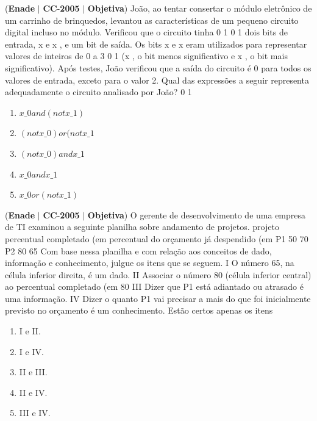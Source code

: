 \documentclass{exam}
\begin{document}
\begin{questions}
\question (\textbf{Enade} $|$ \textbf{CC}-\textbf{2005} $|$ \textbf{Objetiva})
João, ao tentar consertar o módulo eletrônico de um
carrinho de brinquedos, levantou as características de um pequeno
circuito digital incluso no módulo. Verificou que o circuito tinha
0 1 0 1
dois bits de entrada, x e x , e um bit de saída. Os bits x e x
eram utilizados para representar valores de inteiros de 0 a 3
0 1
(x , o bit menos significativo e x , o bit mais significativo).
Após testes, João verificou que a saída do circuito é 0 para
todos os valores de entrada, exceto para o valor 2.
Qual das expressões a seguir representa adequadamente o circuito
analisado por João?
0 1
	\begin{enumerate}[label=\alph*)]
		\item  $ x\_0 and (not x\_1 ) $
		\item  $ (not x\_0 ) or (not x\_1 $
		\item  $(not x\_0 ) and x\_1$
		\item  $x\_0 and x\_1$
		\item  $x\_0 or (not x\_1)$
	\end{enumerate}

\question (\textbf{Enade} $|$ \textbf{CC}-\textbf{2005} $|$ \textbf{Objetiva})
O gerente de desenvolvimento de uma empresa de
TI examinou a seguinte planilha sobre andamento de
projetos.
projeto
percentual
completado (em %
percentual do orçamento
já despendido (em %
P1 50 70
P2 80 65
Com base nessa planilha e com relação aos conceitos de dado,
informação e conhecimento, julgue os itens que se seguem.
I O número 65, na célula inferior direita, é um dado.
II Associar o número 80 (célula inferior central) ao percentual
completado (em %
80%
III Dizer que P1 está adiantado ou atrasado é uma informação.
IV Dizer o quanto P1 vai precisar a mais do que foi
inicialmente previsto no orçamento é um conhecimento.
Estão certos apenas os itens
	\begin{enumerate}[label=\alph*)]
		\item  I e II.
		\item  I e IV.
		\item  II e III.
		\item  II e IV.
		\item  III e IV.
	\end{enumerate}


\end{questions}
\end{document}
